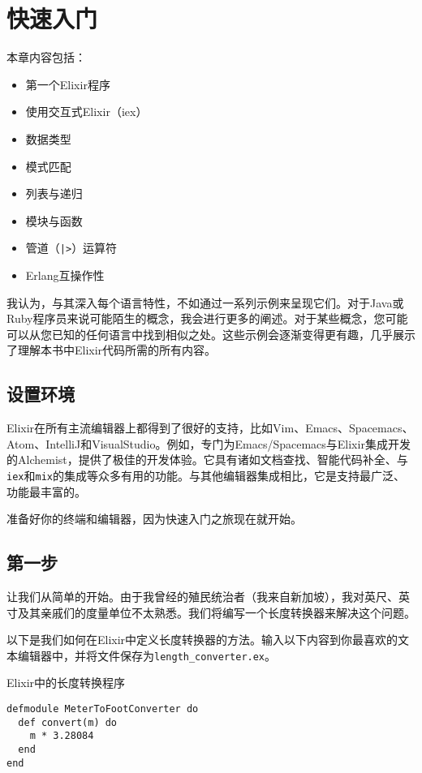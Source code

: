 \chapter{快速入门}\label{chapt:tour}

本章内容包括：

\begin{itemize}

\item 第一个Elixir程序
\item 使用交互式Elixir（iex）
\item 数据类型
\item 模式匹配
\item 列表与递归
\item 模块与函数
\item 管道（\texttt{|>}）运算符
\item Erlang互操作性
\end{itemize}

我认为，与其深入每个语言特性，不如通过一系列示例来呈现它们。对于Java或Ruby程序员来说可能陌生的概念，我会进行更多的阐述。对于某些概念，您可能可以从您已知的任何语言中找到相似之处。这些示例会逐渐变得更有趣，几乎展示了理解本书中Elixir代码所需的所有内容。

\section{设置环境}

Elixir在所有主流编辑器上都得到了很好的支持，比如Vim、Emacs、Spacemacs、Atom、IntelliJ和VisualStudio。例如，专门为Emacs/Spacemacs与Elixir集成开发的Alchemist，提供了极佳的开发体验。它具有诸如文档查找、智能代码补全、与\texttt{iex}和\texttt{mix}的集成等众多有用的功能。与其他编辑器集成相比，它是支持最广泛、功能最丰富的。

准备好你的终端和编辑器，因为快速入门之旅现在就开始。

\section{第一步}

让我们从简单的开始。由于我曾经的殖民统治者（我来自新加坡），我对英尺、英寸及其亲戚们的度量单位不太熟悉。我们将编写一个长度转换器来解决这个问题。

以下是我们如何在Elixir中定义长度转换器的方法。输入以下内容到你最喜欢的文本编辑器中，并将文件保存为\texttt{length\_converter.ex}。

\begin{code}{Elixir中的长度转换程序}
\begin{verbatim}
defmodule MeterToFootConverter do
  def convert(m) do
    m * 3.28084
  end
end
\end{verbatim}
\label{lst:length_converter}
\end{code}

